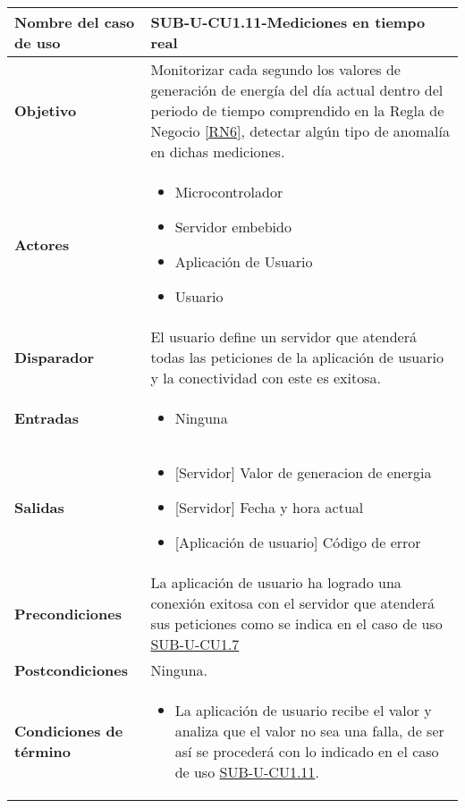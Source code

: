 \begin{longtable}{|J{5cm}|J{10.3cm}|}
	\hline
	\textbf{Nombre del caso de uso} &
		SUB-U-CU1.11-Mediciones en tiempo real \\ \hline
	\textbf{Objetivo} &
		Monitorizar cada segundo los valores de generación de energía del día actual dentro del periodo de tiempo comprendido en la Regla de Negocio \ref{RN6}, detectar algún tipo de anomalía en dichas mediciones. \\ \hline
	\textbf{Actores} &
		\begin{itemize}
		    \item Microcontrolador
			\item Servidor embebido
			\item Aplicación de Usuario
		    \item Usuario
		\end{itemize} \\ \hline
	\textbf{Disparador} & 
	    El usuario define un servidor que atenderá todas las peticiones de la aplicación de usuario y la conectividad con este es exitosa.\\ \hline 
	\textbf{Entradas} & 
		\begin{itemize}
				\item Ninguna
		\end{itemize}\\ \hline 
	\textbf{Salidas} & 
		\begin{itemize}
			\item{[Servidor]} Valor de generacion de energia
			\item{[Servidor]} Fecha y hora actual
			\item{[Aplicación de usuario]} Código de error
		\end{itemize} \\ \hline
	\textbf{Precondiciones} &
		La aplicación de usuario ha logrado una conexión exitosa con el servidor que atenderá sus peticiones como se indica en el caso de uso \hyperref[SUB-U-CU1.7]{SUB-U-CU1.7} \\ \hline
	\textbf{Postcondiciones} &
		Ninguna.\\ \hline
	\textbf{Condiciones de término} & 
		\begin{itemize}
			\item La aplicación de usuario recibe el valor y analiza que el valor no sea una falla, de ser así se procederá con lo indicado en el caso de uso \hyperref[SUB-U-CU1.11]{SUB-U-CU1.11}.
		\end{itemize} \\ \hline 

\end{longtable}
